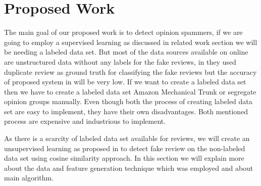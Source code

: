\documentclass[sigconf]{acmart}
\begin{document}
\section{Proposed Work}
The main goal of our proposed work is to detect opinion spammers, if we are going to employ a supervised learning as discussed in related work section we will be needing a labeled data set. But most of the data sources available on online are unstructured data without any labels for the fake reviews, in \cite{8026958} they used duplicate review as ground truth for classifying the fake reviews but the accuracy of proposed system in \cite{8026958} will be very low. If we want to create a labeled data set then we have to create a labeled data set Amazon Mechanical Trunk \cite{6681365} or segregate opinion groups manually. Even though both the process of creating labeled data set are easy to implement, they have their own disadvantages. Both mentioned process are expensive and industrious to implement. 

As there is a scarcity of labeled data set available for reviews, we will create an unsupervised learning as proposed in \cite{originalPaper} to detect fake review on the non-labeled data set using cosine similarity approach. In this section we will explain more about the data and feature generation technique which was employed and about main algorithm.
\end{document}
